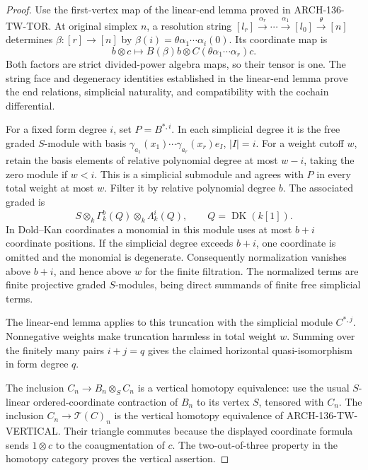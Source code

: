 \begin{proof}
Use the first-vertex map of the linear-end lemma proved in ARCH-136-TW-TOR. At original simplex \(n\), a resolution string
\([l_r]\xrightarrow{\alpha_r}\cdots\xrightarrow{\alpha_1}[l_0]\xrightarrow{\theta}[n]\)
determines \(\beta:[r]\to[n]\) by
\(\beta(i)=\theta\alpha_1\cdots\alpha_i(0)\).
Its coordinate map is
\[
 b\otimes c\longmapsto B(\beta)b\otimes
 C(\theta\alpha_1\cdots\alpha_r)c .
\]
Both factors are strict divided-power algebra maps, so their tensor is one. The string face and degeneracy identities established in the linear-end lemma prove the end relations, simplicial naturality, and compatibility with the cochain differential.

For a fixed form degree \(i\), set \(P=B^{*,i}\). In each simplicial degree it is the free graded \(S\)-module with basis
\(\gamma_{a_1}(x_1)\cdots\gamma_{a_r}(x_r)e_I\), \(|I|=i\).
For a weight cutoff \(w\), retain the basis elements of relative polynomial degree at most \(w-i\), taking the zero module if \(w<i\). This is a simplicial submodule and agrees with \(P\) in every total weight at most \(w\). Filter it by relative polynomial degree \(b\). The associated graded is
\[
 S\otimes_k\Gamma_k^b(Q)\otimes_k\Lambda_k^i(Q),
 \qquad Q=\operatorname{DK}(k[1]).
\]
In Dold--Kan coordinates a monomial in this module uses at most \(b+i\) coordinate positions. If the simplicial degree exceeds \(b+i\), one coordinate is omitted and the monomial is degenerate. Consequently normalization vanishes above \(b+i\), and hence above \(w\) for the finite filtration. The normalized terms are finite projective graded \(S\)-modules, being direct summands of finite free simplicial terms.

The linear-end lemma applies to this truncation with the simplicial module \(C^{*,j}\). Nonnegative weights make truncation harmless in total weight \(w\). Summing over the finitely many pairs \(i+j=q\) gives the claimed horizontal quasi-isomorphism in form degree \(q\).

The inclusion \(C_n\to B_n\otimes_S C_n\) is a vertical homotopy equivalence: use the usual \(S\)-linear ordered-coordinate contraction of \(B_n\) to its vertex \(S\), tensored with \(C_n\). The inclusion \(C_n\to\mathcal T(C)_n\) is the vertical homotopy equivalence of ARCH-136-TW-VERTICAL. Their triangle commutes because the displayed coordinate formula sends \(1\otimes c\) to the coaugmentation of \(c\). The two-out-of-three property in the homotopy category proves the vertical assertion.
\end{proof}

